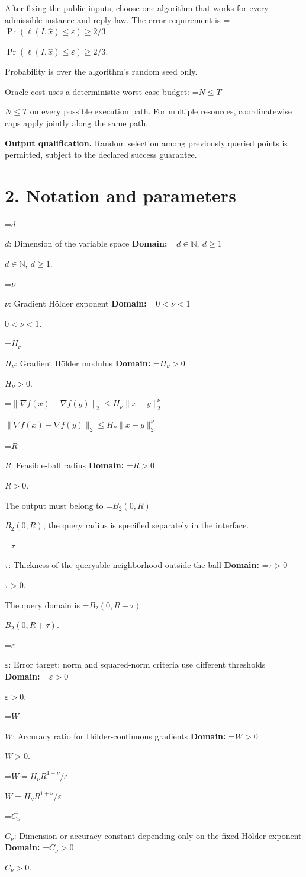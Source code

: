 \documentclass[10pt,a4paper]{article}
\newcommand{\AtlasMath}[1]{\par\begingroup\centering\setbox0=\hbox{$\displaystyle #1$}\ifdim\wd0>1.4\linewidth\typeout{ATLAS WIDE FORMULA: \the\wd0}\fi\ifdim\wd0>\linewidth\resizebox{\linewidth}{!}{\box0}\else\box0\fi\par\endgroup}
\newcommand{\AtlasInlineMath}[1]{\begingroup\setbox0=\hbox{$#1$}\ifdim\wd0>.4\linewidth\endgroup\AtlasMath{#1}\else\endgroup$#1$\fi}
\begin{document}
After fixing the public inputs, choose one algorithm that works for every admissible instance and reply law. The error requirement is \AtlasInlineMath{\Pr(\ell(I,\widehat{x})\le \varepsilon)\ge2/3}.

Probability is over the algorithm's random seed only.

Oracle cost uses a deterministic worst-case budget: \AtlasInlineMath{N\le T} on every possible execution path. For multiple resources, coordinatewise caps apply jointly along the same path.

\textbf{Output qualification.} Random selection among previously queried points is permitted, subject to the declared success guarantee.

\section{2. Notation and parameters}
\AtlasInlineMath{d}: Dimension of the variable space \textbf{Domain:} \AtlasInlineMath{d\in\mathbb{N},\ d\ge1}.

\AtlasInlineMath{\nu}: Gradient Hölder exponent \textbf{Domain:} \AtlasInlineMath{0<\nu<1}.

\AtlasInlineMath{H_\nu}: Gradient Hölder modulus \textbf{Domain:} \AtlasInlineMath{H_\nu>0}.

\AtlasInlineMath{\|\nabla f(x)-\nabla f(y)\|_2\le H_\nu\|x-y\|_2^\nu}

\AtlasInlineMath{R}: Feasible-ball radius \textbf{Domain:} \AtlasInlineMath{R>0}.

The output must belong to \AtlasInlineMath{B_2(0,R)}; the query radius is specified separately in the interface.

\AtlasInlineMath{\tau}: Thickness of the queryable neighborhood outside the ball \textbf{Domain:} \AtlasInlineMath{\tau>0}.

The query domain is \AtlasInlineMath{B_2(0,R+\tau)}.

\AtlasInlineMath{\varepsilon}: Error target; norm and squared-norm criteria use different thresholds \textbf{Domain:} \AtlasInlineMath{\varepsilon>0}.

\AtlasInlineMath{W}: Accuracy ratio for Hölder-continuous gradients \textbf{Domain:} \AtlasInlineMath{W>0}.

\AtlasInlineMath{W=H_\nu R^{1+\nu}/\varepsilon}

\AtlasInlineMath{C_\nu}: Dimension or accuracy constant depending only on the fixed Hölder exponent \textbf{Domain:} \AtlasInlineMath{C_\nu>0}.
\end{document}
